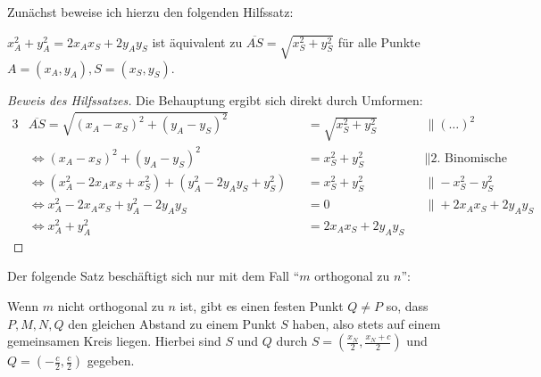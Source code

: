 Zunächst beweise ich hierzu den folgenden Hilfssatz:
\begin{lem}\label{cor_hilfe}
    $x_A^2+y_A^2=2x_Ax_S+2y_Ay_S$ ist äquivalent zu $\overline{AS}=\sqrt{x_S^2+y_S^2}$ für alle 
    Punkte $A=(x_A, y_A), S=(x_S, y_S)$.
\end{lem}
\begin{proof}[Beweis des Hilfssatzes]
    \renewcommand{\qedsymbol}{$\square$}
    Die Behauptung ergibt sich direkt durch Umformen:
    \begin{alignat*}{3}
        &\overline{AS}=\sqrt{(x_A-x_S)^2+(y_A-y_S)^2}&&=\sqrt{x_S^2+y_S^2}\quad&&\|(\ldots)^2\\
        &\Leftrightarrow (x_A-x_S)^2+(y_A-y_S)^2&&=x_S^2+y_S^2\quad &&\|\text{2. Binomische Formel}\\
        &\Leftrightarrow (x_A^2-2x_Ax_S+x_S^2)+(y_A^2-2y_Ay_S+y_S^2)&&=x_S^2+y_S^2\quad &&\|-x_S^2-y_S^2\\
        &\Leftrightarrow x_A^2-2x_Ax_S+y_A^2-2y_Ay_S&&=0\quad &&\|+2x_Ax_S+2y_Ay_S\\
        &\Leftrightarrow x_A^2+y_A^2&&=2x_Ax_S+2y_Ay_S&&
    \end{alignat*}
\end{proof}
Der folgende Satz beschäftigt sich nur mit dem Fall "`$m$ orthogonal zu $n$"':
\begin{thm}\label{aufgabe_3}
    Wenn $m$ nicht orthogonal zu $n$ ist, gibt es einen festen Punkt $Q\neq P$ so, dass $P, M, N, Q$ 
    den gleichen Abstand zu einem Punkt $S$ haben, also stets auf einem gemeinsamen Kreis liegen. 
    Hierbei sind $S$ und $Q$ durch $S=\left(\frac{x_N}{2}, \frac{x_N+c}{2}\right)$ und $Q=\left(-\frac{c}{2}, 
    \frac{c}{2}\right)$ gegeben.
\end{thm}
